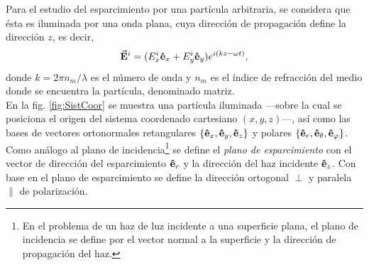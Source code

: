 

Para el estudio del esparcimiento por una partícula arbitraria, se considera que ésta es iluminada por una onda plana, cuya dirección de propagación define la dirección $z$, es decir,
	\begin{equation}
	\va{E}^i = (E_x^i \vu{e}_x + E_y^i \vu{e}_y)e^{i(k z - \omega t)},
	\label{eq:Exyi}
	\end{equation}
donde $k = 2\pi n_m /\lambda$ es el número de onda y $n_m$ es el índice de refracción del medio donde se encuentra la partícula, denominado matriz.\\

En la fig.  \ref{fig:SistCoor} se muestra  una partícula iluminada ---sobre la cual se posiciona el origen del sistema coordenado cartesiano $(x, y, z)$---, así como las bases de vectores ortonormales retangulares $\{\vu{e}_x,\vu{e}_y,\vu{e}_z \}$ y polares $\{\vu{e}_r, \vu{e}_\theta, \vu{e}_\varphi \}$. Como análogo al plano de incidencia\footnote{En el problema de un haz de luz incidente a una superficie plana, el plano de incidencia se define por el vector normal a la superficie y la dirección de propagación del haz.} se define el \emph{plano de esparcimiento} con el vector de dirección del esparcimiento $\vu{e}_r$ y la dirección del haz incidente $\vu{e}_z$. Con base en el plano de esparcimiento se define la dirección ortogonal $\perp$ y paralela $\parallel$ de polarización.

